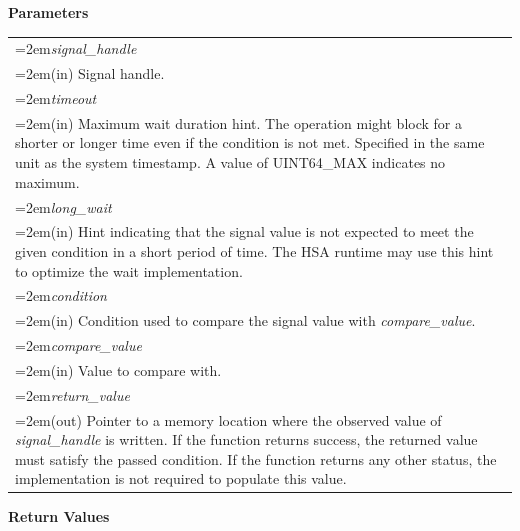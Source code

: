 \documentclass[final]{book}
\newcommand{\hsaarg}[1]{\textit{#1}}
\begin{document}
\noindent\textbf{Parameters}\\[-6mm]
\noindent\begin{longtable}{@{}>{\hangindent=2em}p{\textwidth}}
\hsaarg{signal_\-handle}\\\hspace{2em}(in) Signal handle.\\[2mm]
\hsaarg{timeout}\\\hspace{2em}(in) Maximum wait duration hint. The operation might block for a shorter or longer time even if the condition is not met. Specified in the same unit as the system timestamp. A value of UINT64_\-MAX indicates no maximum.\\[2mm]
\hsaarg{long_\-wait}\\\hspace{2em}(in) Hint indicating that the signal value is not expected to meet the given condition in a short period of time. The HSA runtime may use this hint to optimize the wait implementation.\\[2mm]
\hsaarg{condition}\\\hspace{2em}(in) Condition used to compare the signal value with \textit{compare_\-value}.\\[2mm]
\hsaarg{compare_\-value}\\\hspace{2em}(in) Value to compare with.\\[2mm]
\hsaarg{return_\-value}\\\hspace{2em}(out) Pointer to a memory location where the observed value of \textit{signal_\-handle} is written. If the function returns success, the returned value must satisfy the passed condition. If the function returns any other status, the implementation is not required to populate this value.
\end{longtable}
\vspace{-5mm}\noindent\textbf{Return Values}\\[-6mm]
\end{document}
